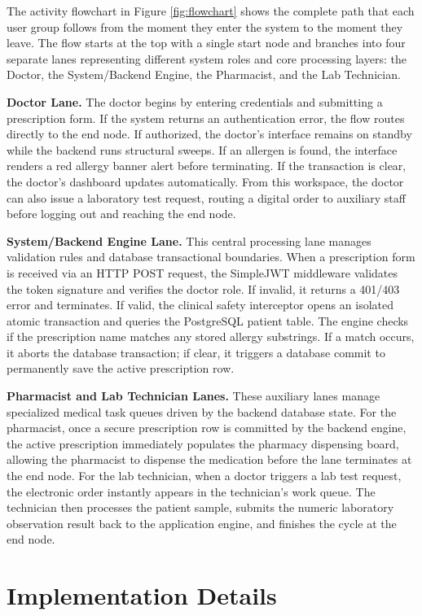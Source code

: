 \documentclass[12pt, a4paper]{report}
\numberwithin{equation}{chapter}
\begin{document}
The activity flowchart in Figure \ref{fig:flowchart} shows the complete path that each user group follows from the moment they enter the system to the moment they leave. The flow starts at the top with a single start node and branches into four separate lanes representing different system roles and core processing layers: the Doctor, the System/Backend Engine, the Pharmacist, and the Lab Technician.

\textbf{Doctor Lane.} The doctor begins by entering credentials and submitting a prescription form. If the system returns an authentication error, the flow routes directly to the end node. If authorized, the doctor's interface remains on standby while the backend runs structural sweeps. If an allergen is found, the interface renders a red allergy banner alert before terminating. If the transaction is clear, the doctor's dashboard updates automatically. From this workspace, the doctor can also issue a laboratory test request, routing a digital order to auxiliary staff before logging out and reaching the end node.

\textbf{System/Backend Engine Lane.} This central processing lane manages validation rules and database transactional boundaries. When a prescription form is received via an HTTP POST request, the SimpleJWT middleware validates the token signature and verifies the doctor role. If invalid, it returns a 401/403 error and terminates. If valid, the clinical safety interceptor opens an isolated atomic transaction and queries the PostgreSQL patient table. The engine checks if the prescription name matches any stored allergy substrings. If a match occurs, it aborts the database transaction; if clear, it triggers a database commit to permanently save the active prescription row.

\textbf{Pharmacist and Lab Technician Lanes.} These auxiliary lanes manage specialized medical task queues driven by the backend database state. For the pharmacist, once a secure prescription row is committed by the backend engine, the active prescription immediately populates the pharmacy dispensing board, allowing the pharmacist to dispense the medication before the lane terminates at the end node. For the lab technician, when a doctor triggers a lab test request, the electronic order instantly appears in the technician's work queue. The technician then processes the patient sample, submits the numeric laboratory observation result back to the application engine, and finishes the cycle at the end node.

\section{Implementation Details}
\end{document}
